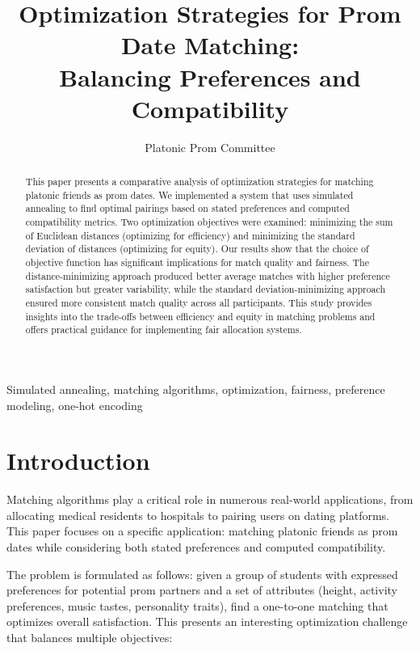 \documentclass[10pt,journal,compsoc]{IEEEtran}
\begin{document}
\title{Optimization Strategies for Prom Date Matching: \\Balancing Preferences and Compatibility}

\author{Platonic Prom Committee}

\maketitle

\begin{abstract}
This paper presents a comparative analysis of optimization strategies for matching platonic friends as prom dates. We implemented a system that uses simulated annealing to find optimal pairings based on stated preferences and computed compatibility metrics. Two optimization objectives were examined: minimizing the sum of Euclidean distances (optimizing for efficiency) and minimizing the standard deviation of distances (optimizing for equity). Our results show that the choice of objective function has significant implications for match quality and fairness. The distance-minimizing approach produced better average matches with higher preference satisfaction but greater variability, while the standard deviation-minimizing approach ensured more consistent match quality across all participants. This study provides insights into the trade-offs between efficiency and equity in matching problems and offers practical guidance for implementing fair allocation systems.
\end{abstract}

\begin{IEEEkeywords}
Simulated annealing, matching algorithms, optimization, fairness, preference modeling, one-hot encoding
\end{IEEEkeywords}

\section{Introduction}
Matching algorithms play a critical role in numerous real-world applications, from allocating medical residents to hospitals to pairing users on dating platforms. This paper focuses on a specific application: matching platonic friends as prom dates while considering both stated preferences and computed compatibility.

The problem is formulated as follows: given a group of students with expressed preferences for potential prom partners and a set of attributes (height, activity preferences, music tastes, personality traits), find a one-to-one matching that optimizes overall satisfaction. This presents an interesting optimization challenge that balances multiple objectives:
\end{document}
